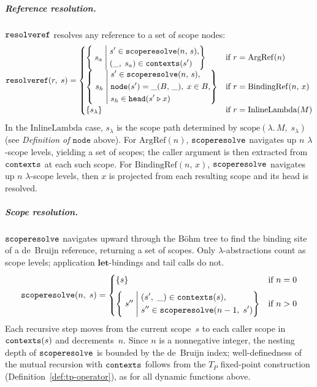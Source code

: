 \subparagraph{Reference resolution.}
$\mathtt{resolveref}$ resolves any reference to a set of scope nodes:
\begin{equation}\label{eq:lambda-resolve-ref}
  \mathtt{resolveref}(r,\; s) =
  \begin{cases}
    \left\{\; s_a \;\middle|\;
      \begin{aligned}
        &s' \in \mathtt{scoperesolve}(n,\, s),\\
        &(\_,\; s_a) \in \mathtt{contexts}(s')
      \end{aligned}
    \right\}
    & \text{if } r = \mathrm{ArgRef}(n) \\[6pt]
    \left\{\; s_h \;\middle|\;
      \begin{aligned}
        &s' \in \mathtt{scoperesolve}(n,\, s),\\
        &\mathtt{node}(s') = \_(B,\, \_),\;
        x \in B,\\
        &s_h \in \mathtt{head}(s' \mathbin{\triangleright} x)
      \end{aligned}
    \right\}
    & \text{if } r = \mathrm{BindingRef}(n,\, x) \\[6pt]
    \{s_{\lambda}\}
    & \text{if } r = \mathrm{InlineLambda}(M)
  \end{cases}
\end{equation}
In the $\mathrm{InlineLambda}$ case,
$s_\lambda$ is the scope path determined by
$\mathrm{scope}(\lambda.\,M,\; s_\lambda)$
(see \emph{Definition of $\mathtt{node}$} above).
For $\mathrm{ArgRef}(n)$,
$\mathtt{scoperesolve}$ navigates up $n$ $\lambda$-scope levels,
yielding a set of scopes;
the caller argument is then extracted from $\mathtt{contexts}$
at each such scope.
For $\mathrm{BindingRef}(n,\, x)$,
$\mathtt{scoperesolve}$ navigates up $n$ $\lambda$-scope levels,
then $x$ is projected from each resulting scope and its head is
resolved.

\subparagraph{Scope resolution.}
$\mathtt{scoperesolve}$ navigates upward through the B\"ohm tree
to find the binding site of a de~Bruijn reference,
returning a set of scopes.
Only $\lambda$-abstractions count as scope levels;
application $\mathbf{let}$-bindings and tail calls do not.
\begin{equation}\label{eq:lambda-scope}
  \mathtt{scoperesolve}(n,\; s) =
  \begin{cases}
    \{s\} & \text{if } n = 0 \\[6pt]
    \left\{\; s'' \;\middle|\;
      \begin{aligned}
        &(s',\; \_) \in \mathtt{contexts}(s),\\
        &s'' \in \mathtt{scoperesolve}(n - 1,\; s')
      \end{aligned}
    \right\}
    & \text{if } n > 0
  \end{cases}
\end{equation}
Each recursive step moves from the current scope~$s$ to
each caller scope in $\mathtt{contexts}(s)$
and decrements~$n$.
Since $n$ is a nonnegative integer, the nesting depth of
$\mathtt{scoperesolve}$ is bounded by the de~Bruijn index;
well-definedness of the mutual recursion with $\mathtt{contexts}$
follows from the $T_P$ fixed-point construction
(Definition~\ref{def:tp-operator}), as for all dynamic
functions above.

